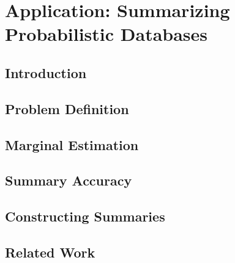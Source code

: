 \chapter{Application: Summarizing Probabilistic Databases}
\section{Introduction}


\section{Problem Definition}


\section{Marginal Estimation}


\section{Summary Accuracy}


\section{Constructing Summaries}
%

\section{Related Work}

